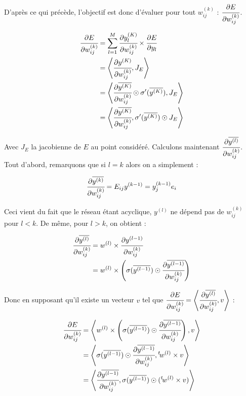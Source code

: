 D'après ce qui précède, l'objectif est donc d'évaluer pour tout $w_{ij}^{(k)}$ :
 $\cfrac{\partial E}{\partial w_{ij}^{(k)}}$.

\begin{align*}
\cfrac{\partial E}{\partial w_{ij}^{(k)}} &= \sum_{l = 1}^{M} \cfrac{\partial y_l^{(K)}}{\partial w_{ij}^{(k)}} \times \cfrac{\partial E}{\partial y_l}\\
&= \left\langle\cfrac{\partial y^{(K)}}{\partial w_{ij}^{(k)}}, J_E\right\rangle\\
&= \left\langle\cfrac{\partial \overline{y^{(K)}}}{\partial w_{ij}^{(k)}} \odot \sigma'(\overline{y^{(K)}}), J_E\right\rangle \\
&= \left\langle\cfrac{\partial \overline{y^{(K)}}}{\partial w_{ij}^{(k)}} ,\sigma'(\overline{y^{(K)}}) \odot J_E\right\rangle
\end{align*}

Avec $J_E$ la jacobienne de $E$ au point considéré.
Calculons maintenant $\cfrac{\partial \overline{y^{(l)}}}{\partial w_{ij}^{(k)}}$.
Tout d'abord, remarquons que si $l = k$ alors on a simplement :

\[\cfrac{\partial \overline{y^{(k)}}}{\partial w_{ij}^{(k)}} = E_{ij} y^{(k-1)} = y^{(k-1)}_j e_i\]

Ceci vient du fait que le réseau étant acyclique, $ y^{(l)}$ ne dépend pas de
$w_{ij}^{(k)}$ pour $l < k$. De même, pour $l > k$, on obtient :

\begin{align*}
\cfrac{\partial \overline{y^{(l)}}}{\partial w_{ij}^{(k)}} &= w^{(l)} \times \cfrac{\partial y^{(l-1)}}{\partial w_{ij}^{(k)}}\\
&= w^{(l)} \times \left(\sigma(\overline{y^{(l-1)}}) \odot \cfrac{\partial \overline{y^{(l-1)}}}{\partial w_{ij}^{(k)}}\right)
\end{align*}

Donc en supposant qu'il existe un vecteur $v$ tel que $\cfrac{\partial E}{\partial w_{ij}^{(k)}} = \left\langle\cfrac{\partial \overline{y^{(l)}}}{\partial w_{ij}^{(k)}} ,v\right\rangle$ :

\begin{align*}
\cfrac{\partial E}{\partial w_{ij}^{(k)}} &= \left\langle w^{(l)} \times \left(\sigma(\overline{y^{(l-1)}}) \odot \cfrac{\partial \overline{y^{(l-1)}}}{\partial w_{ij}^{(k)}}\right) ,v\right\rangle\\
&= \left\langle\sigma(\overline{y^{(l-1)}}) \odot \cfrac{\partial \overline{y^{(l-1)}}}{\partial w_{ij}^{(k)}},{}^t \! w^{(l)} \times v\right\rangle\\
&= \left\langle\cfrac{\partial \overline{y^{(l-1)}}}{\partial w_{ij}^{(k)}},\sigma(\overline{y^{(l-1)}}) \odot ({}^t \! w^{(l)} \times v)\right\rangle\\
\end{align*}


